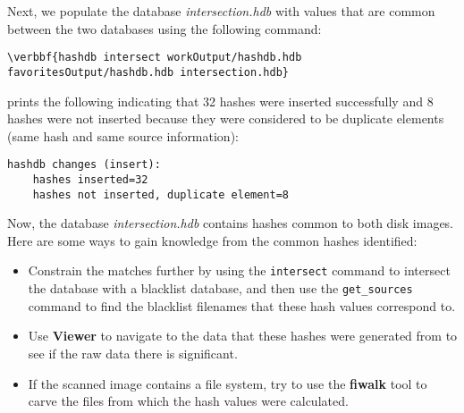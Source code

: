 Next, we populate the database \textit{intersection.hdb} with values that are common between the two databases using the following command:
\begin{Verbatim}[commandchars=\\\{\}]
\verbbf{hashdb intersect workOutput/hashdb.hdb favoritesOutput/hashdb.hdb intersection.hdb}
\end{Verbatim}

\hash prints the following indicating that 32 hashes were inserted successfully and 8 hashes were not inserted because they were considered to be duplicate elements (same hash and same source information):
\begingroup
\footnotesize
\begin{Verbatim}[fontfamily=courier]
hashdb changes (insert):
    hashes inserted=32
    hashes not inserted, duplicate element=8
\end{Verbatim}
\endgroup

Now, the database \textit{intersection.hdb} contains hashes common to both disk images. \\

Here are some ways to gain knowledge from the common hashes identified:
\begin{itemize}
\item Constrain the matches further by using the \texttt{intersect} command
to intersect the database with a blacklist database,
and then use the \texttt{get\_sources} command
to find the blacklist filenames that these hash values correspond to.
\item Use \bulk \textbf{Viewer} to navigate to the data that these hashes were generated from
to see if the raw data there is significant.
\item If the scanned image contains a file system,
try to use the \textbf{fiwalk} tool to carve the files from which the hash values
were calculated.
\end{itemize}
